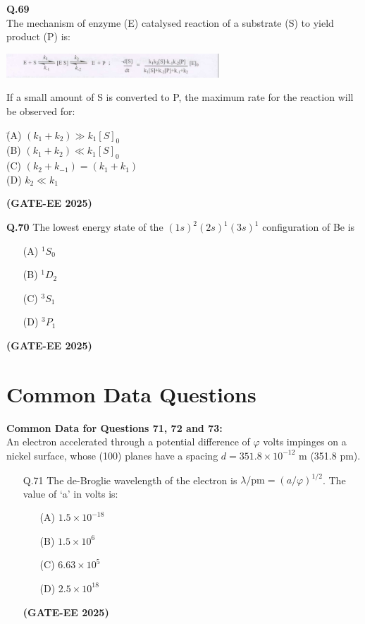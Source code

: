 \documentclass[12pt]{article}
\begin{document}
\begin{enumerate}
\vspace{0.5cm}

\textbf{Q.69} \\
The mechanism of enzyme (E) catalysed reaction of a substrate (S) to yield product (P) is:

\begin{center}
\includegraphics[width=0.6\textwidth]{q69.png}
\end{center}

If a small amount of S is converted to P, the maximum rate for the reaction will be observed for:

\begin{tabbing}
\hspace{1cm} \= (A) \quad $(k_1 + k_2) \gg k_1 [S]_0$ \\
\> (B) \quad $(k_1 + k_2) \ll k_1 [S]_0$ \\
\> (C) \quad $(k_2 + k_{-1}) = (k_1 + k_1)$ \\
\> (D) \quad $k_2 \ll k_1$
\end{tabbing}   \textbf{(GATE-EE 2025)}


\textbf{Q.70} The lowest energy state of the $(1s)^2(2s)^1(3s)^1$ configuration of Be is

\begin{enumerate}
\item[(A)] $^1S_0$
\item[(B)] $^1D_2$
\item[(C)] $^3S_1$
\item[(D)] $^3P_1$
\end{enumerate}   \textbf{(GATE-EE 2025)}


\vspace{0.5cm}


\section*{Common Data Questions}

\textbf{Common Data for Questions 71, 72 and 73:} \\
An electron accelerated through a potential difference of $\varphi$ volts impinges on a nickel surface, whose (100) planes have a spacing $d = 351.8 \times 10^{-12}$ m (351.8 pm).

\begin{itemize}
    \item[Q.71] The de-Broglie wavelength of the electron is $\lambda/\text{pm} = (a/\varphi)^{1/2}$. The value of ‘a’ in volts is:
    \begin{enumerate}
        \item[(A)] $1.5 \times 10^{-18}$
        \item[(B)] $1.5 \times 10^6$
        \item[(C)] $6.63 \times 10^5$
        \item[(D)] $2.5 \times 10^{18}$
    \end{enumerate}   \textbf{(GATE-EE 2025)}



\end{itemize}
\end{enumerate}
\end{document}
